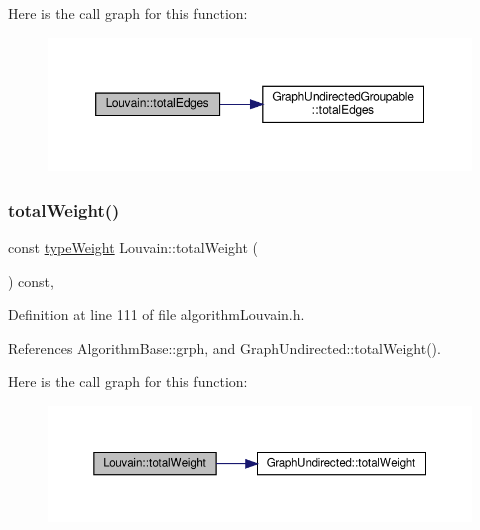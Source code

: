Here is the call graph for this function\+:
\nopagebreak
\begin{figure}[H]
\begin{center}
\leavevmode
\includegraphics[width=350pt]{classLouvain_a5f8dc310d5f177b29804298966ac742d_cgraph}
\end{center}
\end{figure}
\mbox{\label{classLouvain_aa772b7343d4a16534ef1dc45fa208815}} 
\subsubsection{\texorpdfstring{total\+Weight()}{totalWeight()}}
{\footnotesize\ttfamily const \hyperlink{edge_8h_a2e7ea3be891ac8b52f749ec73fee6dd2}{type\+Weight} Louvain\+::total\+Weight (\begin{DoxyParamCaption}{ }\end{DoxyParamCaption}) const\hspace{0.3cm}{\ttfamily [inline]}, {\ttfamily [private]}}



Definition at line 111 of file algorithm\+Louvain.\+h.



References Algorithm\+Base\+::grph, and Graph\+Undirected\+::total\+Weight().

Here is the call graph for this function\+:
\nopagebreak
\begin{figure}[H]
\begin{center}
\leavevmode
\includegraphics[width=350pt]{classLouvain_aa772b7343d4a16534ef1dc45fa208815_cgraph}
\end{center}
\end{figure}
\mbox{\label{classLouvain_aa342e14bd6eb07d05786f7069825a0c3}} 
